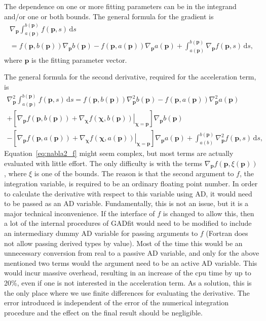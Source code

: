 \documentclass{article}
\newcommand{\D}{\,\textrm{d}}
\begin{document}
The dependence on one or more fitting parameters can be in the integrand and/or one or both bounds. The general formula for the gradient is
\begin{multline}
  \label{eq:grad_f}
  \nabla_{\bm p} \int_{a(\bm p)}^{b(\bm p)} f(\bm p, s) \D s \\
  = f(\bm p, b(\bm p)) \nabla_{\bm p} b(\bm p) - f(\bm p, a(\bm p))
  \nabla_{\bm p} a(\bm p) + \int_{a(\bm p)}^{b(\bm p)} \nabla_{\bm p}
  f(\bm p, s) \D s,
\end{multline}
where $\bm p$ is the fitting parameter vector.

The general formula for the second derivative, required for the acceleration term, is
\begin{multline}
  \label{eq:nabla2_f}
  \nabla_{\bm p}^2 \int_{a(\bm p)}^{b(\bm p)} f(\bm p,s) \D s = f(\bm
  p,b(\bm p)) \nabla_{\bm p}^2 b(\bm p) - f(\bm p,a(\bm p))
  \nabla_{\bm p}^2 a(\bm p) \\
  + \left[ \nabla_{\bm p} f(\bm p,b(\bm p)) + \left. \nabla_{\bm\chi}
      f(\bm\chi,b(\bm p)) \right|_{\bm\chi=\bm p} \right] \nabla_{\bm
    p} b(\bm p) \\
  - \left[ \nabla_{\bm p} f(\bm p,a(\bm p)) + \left. \nabla_{\bm\chi}
      f(\bm\chi,a(\bm p)) \right|_{\bm\chi=\bm p} \right] \nabla_{\bm
    p} a(\bm p) + \int_{a(b)}^{b(\bm p)} \nabla_{\bm p}^2 f(\bm p,s)
  \D s,
\end{multline}
Equation~\eqref{eq:nabla2_f} might seem complex, but most terms are actually evaluated with little effort. The only difficulty is with the terms $\nabla_{\bm p} f(\bm p,\xi(\bm p))$, where $\xi$ is one of the bounds. The reason is that the second argument to $f$, the integration variable, is required to be an ordinary floating point number. In order to calculate the derivative with respect to this variable using AD, it would need to be passed as an AD variable. Fundamentally, this is not an issue, but it is a major technical inconvenience. If the interface of $f$ is changed to allow this, then a lot of the internal procedures of GADfit would need to be modified to include an intermediary dummy AD variable for passing arguments to $f$ (Fortran does not allow passing derived types by value). Most of the time this would be an unnecessary conversion from real to a passive AD variable, and only for the above mentioned two terms would the argument need to be an active AD variable. This would incur massive overhead, resulting in an increase of the cpu time by up to 20\%, even if one is not interested in the acceleration term. As a solution, this is the only place where we use finite differences for evaluating the derivative. The error introduced is independent of the error of the numerical integration procedure and the effect on the final result should be negligible.
\end{document}
